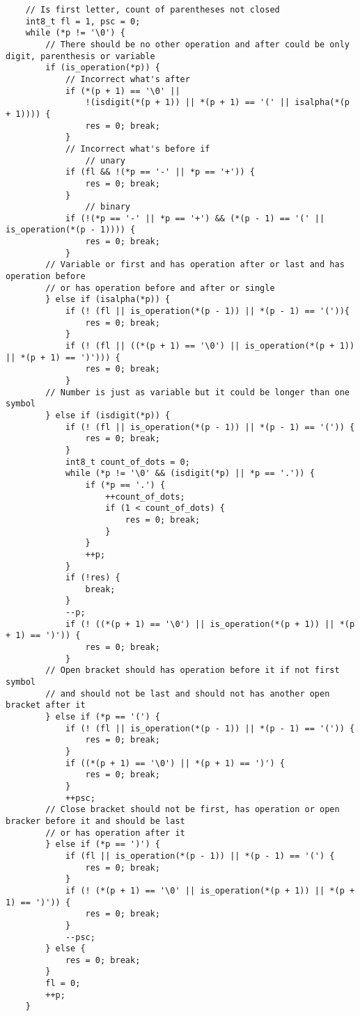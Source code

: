 \documentclass[a4paper]{article}
\newcounter{i}
\begin{document}
\begin{enumerate}[label=\textbf{\arabic*}.]
\begin{verbatim}
    // Is first letter, count of parentheses not closed 
    int8_t fl = 1, psc = 0;
    while (*p != '\0') {
        // There should be no other operation and after could be only digit, parenthesis or variable
        if (is_operation(*p)) {
            // Incorrect what's after
            if (*(p + 1) == '\0' ||
                !(isdigit(*(p + 1)) || *(p + 1) == '(' || isalpha(*(p + 1)))) {
                res = 0; break;
            }
            // Incorrect what's before if
                // unary
            if (fl && !(*p == '-' || *p == '+')) {
                res = 0; break;
            }
                // binary
            if (!(*p == '-' || *p == '+') && (*(p - 1) == '(' || is_operation(*(p - 1)))) {
                res = 0; break;
            }
        // Variable or first and has operation after or last and has operation before
        // or has operation before and after or single
        } else if (isalpha(*p)) {
            if (! (fl || is_operation(*(p - 1)) || *(p - 1) == '(')){
                res = 0; break;
            }
            if (! (fl || ((*(p + 1) == '\0') || is_operation(*(p + 1)) || *(p + 1) == ')'))) {
                res = 0; break;
            }
        // Number is just as variable but it could be longer than one symbol
        } else if (isdigit(*p)) {
            if (! (fl || is_operation(*(p - 1)) || *(p - 1) == '(')) {
                res = 0; break;
            }
            int8_t count_of_dots = 0;
            while (*p != '\0' && (isdigit(*p) || *p == '.')) {
                if (*p == '.') {
                    ++count_of_dots;
                    if (1 < count_of_dots) {
                        res = 0; break;
                    }
                }
                ++p;
            }
            if (!res) {
                break;
            }
            --p;
            if (! ((*(p + 1) == '\0') || is_operation(*(p + 1)) || *(p + 1) == ')')) {
                res = 0; break;
            }
        // Open bracket should has operation before it if not first symbol
        // and should not be last and should not has another open bracket after it
        } else if (*p == '(') {
            if (! (fl || is_operation(*(p - 1)) || *(p - 1) == '(')) {
                res = 0; break;
            }
            if ((*(p + 1) == '\0') || *(p + 1) == ')') {
                res = 0; break;
            }
            ++psc;
        // Close bracket should not be first, has operation or open bracker before it and should be last
        // or has operation after it
        } else if (*p == ')') {
            if (fl || is_operation(*(p - 1)) || *(p - 1) == '(') {
                res = 0; break;
            }
            if (! (*(p + 1) == '\0' || is_operation(*(p + 1)) || *(p + 1) == ')')) {
                res = 0; break;
            }
            --psc;
        } else {
            res = 0; break;
        }
        fl = 0;
        ++p;
    }


\end{verbatim}
\end{enumerate}
\end{document}
